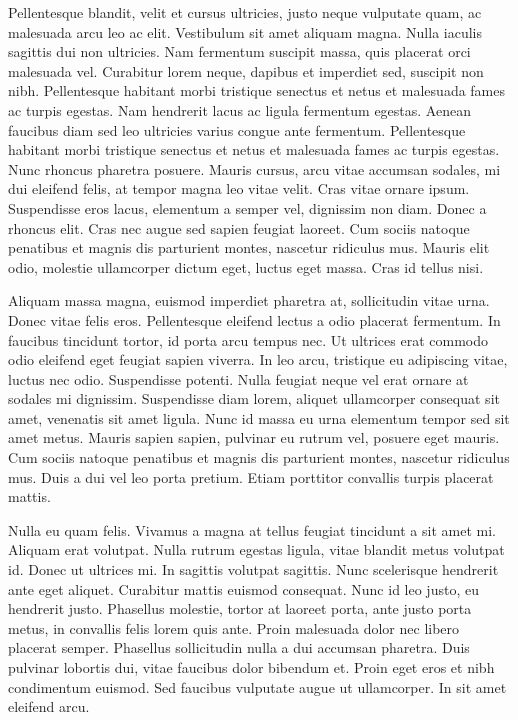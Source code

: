 Pellentesque blandit, velit et cursus ultricies, justo neque vulputate quam, ac malesuada arcu leo ac elit.
Vestibulum sit amet aliquam magna.
Nulla iaculis sagittis dui non ultricies.
Nam fermentum suscipit massa, quis placerat orci malesuada vel.
Curabitur lorem neque, dapibus et imperdiet sed, suscipit non nibh.
Pellentesque habitant morbi tristique senectus et netus et malesuada fames ac turpis egestas.
Nam hendrerit lacus ac ligula fermentum egestas.
Aenean faucibus diam sed leo ultricies varius congue ante fermentum.
Pellentesque habitant morbi tristique senectus et netus et malesuada fames ac turpis egestas.
Nunc rhoncus pharetra posuere.
Mauris cursus, arcu vitae accumsan sodales, mi dui eleifend felis, at tempor magna leo vitae velit.
Cras vitae ornare ipsum.
Suspendisse eros lacus, elementum a semper vel, dignissim non diam.
Donec a rhoncus elit.
Cras nec augue sed sapien feugiat laoreet.
Cum sociis natoque penatibus et magnis dis parturient montes, nascetur ridiculus mus.
Mauris elit odio, molestie ullamcorper dictum eget, luctus eget massa.
Cras id tellus nisi.

Aliquam massa magna, euismod imperdiet pharetra at, sollicitudin vitae urna.
Donec vitae felis eros.
Pellentesque eleifend lectus a odio placerat fermentum.
In faucibus tincidunt tortor, id porta arcu tempus nec.
Ut ultrices erat commodo odio eleifend eget feugiat sapien viverra.
In leo arcu, tristique eu adipiscing vitae, luctus nec odio.
Suspendisse potenti.
Nulla feugiat neque vel erat ornare at sodales mi dignissim.
Suspendisse diam lorem, aliquet ullamcorper consequat sit amet, venenatis sit amet ligula.
Nunc id massa eu urna elementum tempor sed sit amet metus.
Mauris sapien sapien, pulvinar eu rutrum vel, posuere eget mauris.
Cum sociis natoque penatibus et magnis dis parturient montes, nascetur ridiculus mus.
Duis a dui vel leo porta pretium.
Etiam porttitor convallis turpis placerat mattis.

Nulla eu quam felis.
Vivamus a magna at tellus feugiat tincidunt a sit amet mi.
Aliquam erat volutpat.
Nulla rutrum egestas ligula, vitae blandit metus volutpat id.
Donec ut ultrices mi.
In sagittis volutpat sagittis.
Nunc scelerisque hendrerit ante eget aliquet.
Curabitur mattis euismod consequat.
Nunc id leo justo, eu hendrerit justo.
Phasellus molestie, tortor at laoreet porta, ante justo porta metus, in convallis felis lorem quis ante.
Proin malesuada dolor nec libero placerat semper.
Phasellus sollicitudin nulla a dui accumsan pharetra.
Duis pulvinar lobortis dui, vitae faucibus dolor bibendum et.
Proin eget eros et nibh condimentum euismod.
Sed faucibus vulputate augue ut ullamcorper.
In sit amet eleifend arcu.

